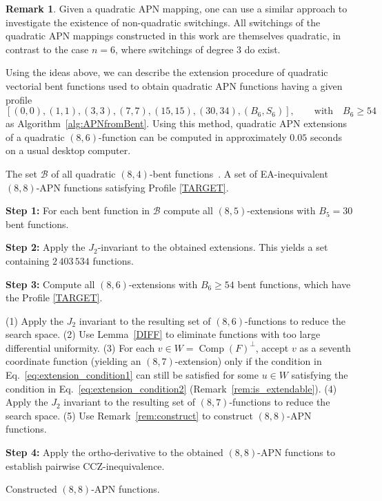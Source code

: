 \documentclass{amsart}[11pt]
\theoremstyle{plain}
\theoremstyle{definition}
\newtheorem{remark}[theorem]{Remark}
\numberwithin{theorem}{section}
\numberwithin{equation}{section}
\numberwithin{table}{section}
\numberwithin{figure}{section}
\numberwithin{algorithm}{section}
\DeclareMathOperator{\comp}{Comp}
\begin{document}
\begin{remark}
Given a quadratic APN mapping, one can use a similar approach to investigate the existence of non-quadratic switchings. All switchings of the quadratic APN mappings constructed in this work are themselves quadratic, in contrast to the case $n=6$, where switchings of degree $3$ do exist.
\end{remark}

Using the ideas above, we can describe the extension procedure of quadratic vectorial bent functions used to obtain quadratic APN functions having a given profile 
\begin{equation}
\label{TARGET}
[(0, 0), (1, 1), (3, 3), (7, 7), (15, 15), (30,34), (B_6, S_6)],\qquad \text{with}\quad B_6 \geq 54 
\end{equation}
as Algorithm~\ref{alg:APNfromBent}. Using this method, quadratic APN extensions of a quadratic $(8,6)$-function can be computed in approximately $0.05$ seconds on a usual desktop computer.

\begin{algorithm}
	\caption{Quadratic $(8,8)$-APN functions from $(8,4)$-bent functions}
	\begin{algorithmic}[1]
		\Require The set $\mathcal{B}$ of all quadratic $(8,4)$-bent functions~\cite{PolujanPott2022BFA}.
		\Ensure A set of EA-inequivalent $(8,8)$-APN functions satisfying Profile \ref{TARGET}.
		
		\State\textbf{Step 1:} For each bent function in $\mathcal{B}$ compute all $(8,5)$-extensions with $B_5=30$ bent functions.
		
		\State\textbf{Step 2:} Apply the $J_2$-invariant to the obtained extensions. This yields a set containing $2\,403\,534$ functions.
		
		\State \textbf{Step 3:} Compute all $(8,6)$-extensions with $B_6 \ge 54$ bent functions, which have the Profile \ref{TARGET}. 
		
		\State (1) Apply the $J_2$ invariant to the resulting set of $(8,6)$-functions to reduce
        \State the search space.
		\State (2) Use Lemma~\ref{DIFF} to eliminate functions with too large differential
        \State uniformity.
		\State (3) For each $v \in W = \comp(F)^\perp$, accept $v$ as a seventh coordinate function
        \State (yielding an $(8,7)$-extension) only if the condition in Eq.~\eqref{eq:extension_condition1} can still be 
        \State satisfied for some $u \in W$ satisfying the condition in Eq.~\eqref{eq:extension_condition2} (Remark~\ref{rem:is_extendable}).
        \State (4) Apply the $J_2$ invariant to the resulting set of $(8,7)$-functions to reduce
        \State the search space.
        \State (5) Use Remark~\ref{rem:construct} to construct $(8,8)$-APN functions.
		\EndFor
		
		\State\textbf{Step 4:} Apply the ortho-derivative to the obtained $(8,8)$-APN functions to establish pairwise CCZ-inequivalence.
		
		\State \Return Constructed $(8,8)$-APN functions.
	\end{algorithmic}
	\label{alg:APNfromBent}
\end{algorithm}
\end{document}
